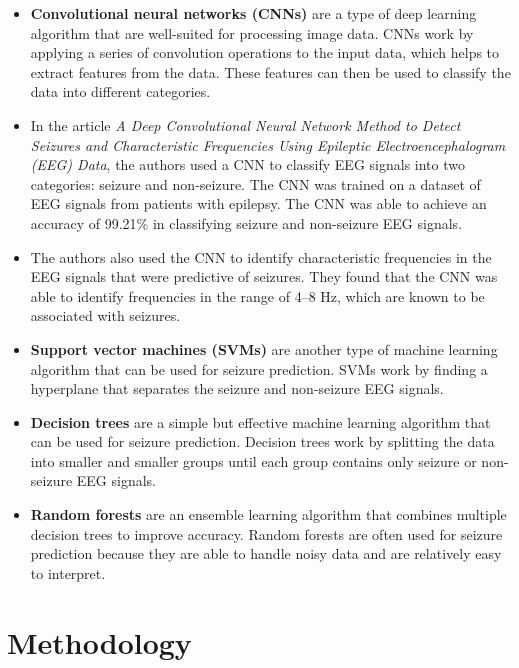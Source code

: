 \documentclass[stu,donotrepeattitle]{apa7}
\begin{document}
\begin{itemize}

    \item \textbf{Convolutional neural networks (CNNs)} are a type of deep learning algorithm that are well-suited for processing image data. CNNs work by applying a series of convolution operations to the input data, which helps to extract features from the data. These features can then be used to classify the data into different categories.
    
    \item In the article \textit{A Deep Convolutional Neural Network Method to Detect Seizures and Characteristic Frequencies Using Epileptic Electroencephalogram (EEG) Data}, the authors used a CNN to classify EEG signals into two categories: seizure and non-seizure. The CNN was trained on a dataset of EEG signals from patients with epilepsy. The CNN was able to achieve an accuracy of 99.21\% in classifying seizure and non-seizure EEG signals.
    
    \item The authors also used the CNN to identify characteristic frequencies in the EEG signals that were predictive of seizures. They found that the CNN was able to identify frequencies in the range of 4--8 Hz, which are known to be associated with seizures.
    
    \item \textbf{Support vector machines (SVMs)} are another type of machine learning algorithm that can be used for seizure prediction. SVMs work by finding a hyperplane that separates the seizure and non-seizure EEG signals.
    
    \item \textbf{Decision trees} are a simple but effective machine learning algorithm that can be used for seizure prediction. Decision trees work by splitting the data into smaller and smaller groups until each group contains only seizure or non-seizure EEG signals.
    
    \item \textbf{Random forests} are an ensemble learning algorithm that combines multiple decision trees to improve accuracy. Random forests are often used for seizure prediction because they are able to handle noisy data and are relatively easy to interpret.
    
\end{itemize}


\section{Methodology}
\end{document}
